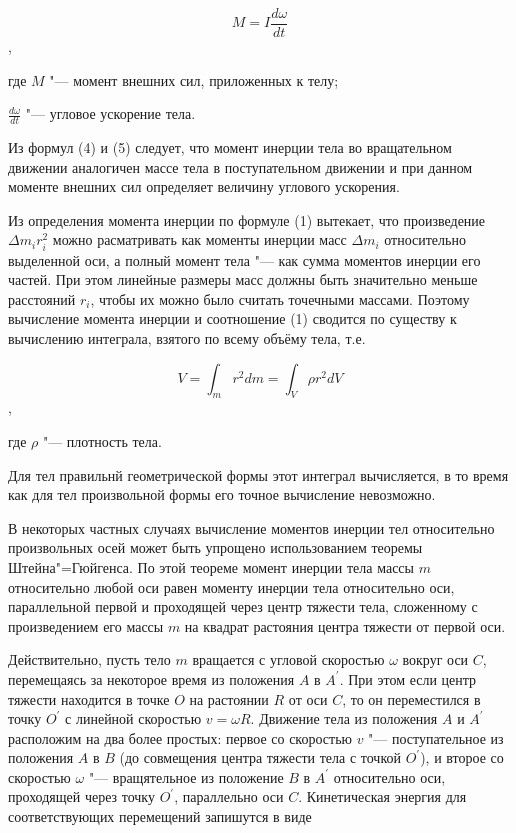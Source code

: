 \begin{equation}
    M = I\frac{d\omega}{dt} 
\end{equation},

где $M$ "--- момент внешних сил, приложенных к телу;

$\frac{d\omega}{dt}$ "--- угловое ускорение тела.

Из формул (4) и (5) следует, что момент инерции тела во вращательном движении аналогичен массе тела в
поступательном движении и при данном моменте внешних сил определяет величину углового ускорения.

Из определения момента инерции по формуле (1) вытекает,
что произведение $\Delta m_ir_i^2$ можно расматривать как моменты инерции масс $\Delta m_i$ относительно выделенной оси,
а полный момент тела "--- как сумма моментов инерции его частей. При этом линейные размеры масс должны быть значительно меньше расстояний $r_i$,
чтобы их можно было считать точечными массами. Поэтому вычисление момента инерции и соотношение (1) сводится по существу к вычислению интеграла,
взятого по всему объёму тела, т.е.

\begin{equation}
    V = \int_m r^2dm = \int_V \rho r^2 dV
\end{equation},

где $\rho$  "--- плотность тела.

Для тел правильнй геометрической формы этот интеграл вычисляется,
в то время как для тел произвольной формы его точное вычисление невозможно.

В некоторых частных случаях вычисление моментов инерции тел относительно
произвольных осей может быть упрощено использованием теоремы Штейна"=Гюйгенса.
По этой теореме момент инерции тела массы $m$ относительно любой оси равен моменту инерции тела относительно оси,
параллельной первой и проходящей через центр тяжести тела,
сложенному с произведением его массы $m$ на квадрат растояния центра тяжести от первой оси.

Действительно, пусть тело $m$ вращается с угловой скоростью $\omega$ вокруг оси $C$,
перемещаясь за некоторое время из положения $A$ в $A^{'}$.
При этом если центр тяжести находится в точке $O$ на растоянии $R$ от оси $C$,
то он переместился в точку $O^{'}$ с линейной скоростью $v = \omega R$.
Движение тела из положения $A$ и $A^{'}$ расположим на два более простых:
первое со скоростью $v$ "--- поступательное из положения $A$ в $B$
(до совмещения центра тяжести тела с точкой $O^{'}$),
и второе со скоростью $\omega$ "--- вращятельное из положение $B$ в $A^{'}$ относительно оси,
проходящей через точку $O^{'}$, параллельно оси $C$.
Кинетическая энергия для соответствующих перемещений запишутся в виде

